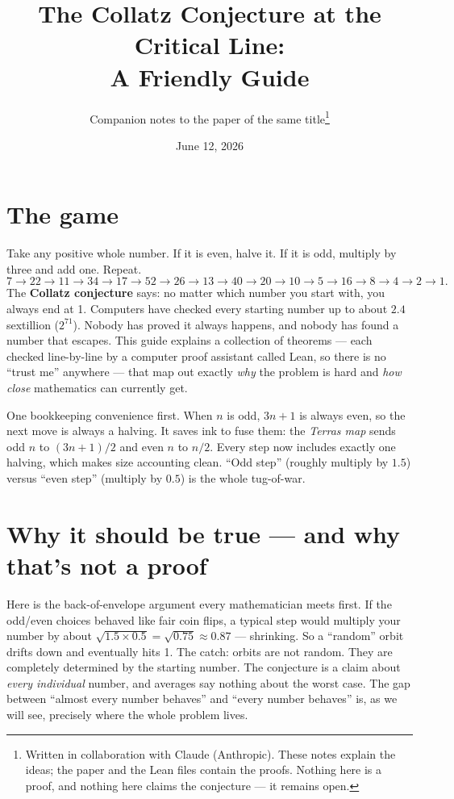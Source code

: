 \documentclass[11pt]{article}
\title{The Collatz Conjecture at the Critical Line:\\
       \Large A Friendly Guide}
\author{Companion notes to the paper of the same title\thanks{Written in
collaboration with Claude (Anthropic). These notes explain the ideas; the
paper and the Lean files contain the proofs. Nothing here is a proof, and
nothing here claims the conjecture --- it remains open.}}
\date{June 12, 2026}
\begin{document}
\maketitle

\section{The game}

Take any positive whole number. If it is even, halve it. If it is odd,
multiply by three and add one. Repeat.
\[
7 \to 22 \to 11 \to 34 \to 17 \to 52 \to 26 \to 13 \to 40 \to 20 \to 10
\to 5 \to 16 \to 8 \to 4 \to 2 \to 1.
\]
The \textbf{Collatz conjecture} says: no matter which number you start
with, you always end at 1. Computers have checked every starting number
up to about $2.4$ sextillion ($2^{71}$). Nobody has proved it always
happens, and nobody has found a number that escapes. This guide explains
a collection of theorems --- each checked line-by-line by a computer
proof assistant called Lean, so there is no ``trust me'' anywhere ---
that map out exactly \emph{why} the problem is hard and \emph{how close}
mathematics can currently get.

One bookkeeping convenience first. When $n$ is odd, $3n+1$ is always
even, so the next move is always a halving. It saves ink to fuse them:
the \emph{Terras map} sends odd $n$ to $(3n+1)/2$ and even $n$ to $n/2$.
Every step now includes exactly one halving, which makes size accounting
clean. ``Odd step'' (roughly multiply by $1.5$) versus ``even step''
(multiply by $0.5$) is the whole tug-of-war.

\section{Why it should be true --- and why that's not a proof}

Here is the back-of-envelope argument every mathematician meets first.
If the odd/even choices behaved like fair coin flips, a typical step
would multiply your number by about
$\sqrt{1.5 \times 0.5} = \sqrt{0.75} \approx 0.87$ --- shrinking. So a
``random'' orbit drifts down and eventually hits 1. The catch: orbits
are not random. They are completely determined by the starting number.
The conjecture is a claim about \emph{every individual} number, and
averages say nothing about the worst case. The gap between ``almost
every number behaves'' and ``every number behaves'' is, as we will see,
precisely where the whole problem lives.
\end{document}
